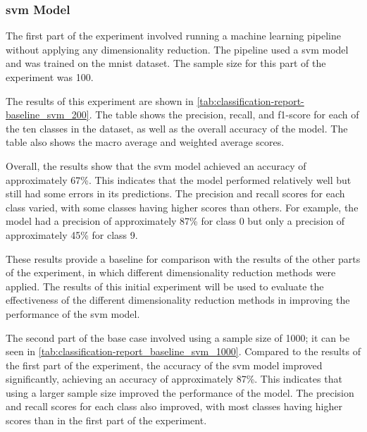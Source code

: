 \subsubsection{svm Model}\label{subsubsec:experiment_4_no_dimmensionality_reduction}





The first part of the experiment involved running a machine learning pipeline without applying any dimensionality reduction. The pipeline used a \gls{svm} model and was trained on the \gls{mnist} dataset. The sample size for this part of the experiment was 100.

The results of this experiment are shown in \ref{tab:classification-report-baseline_svm_200}. The table shows the precision, recall, and f1-score for each of the ten classes in the dataset, as well as the overall accuracy of the model. The table also shows the macro average and weighted average scores.

Overall, the results show that the \gls{svm} model achieved an accuracy of approximately 67\%. This indicates that the model performed relatively well but still had some errors in its predictions. The precision and recall scores for each class varied, with some classes having higher scores than others. For example, the model had a precision of approximately 87\% for class 0 but only a precision of approximately 45\% for class 9.

These results provide a baseline for comparison with the results of the other parts of the experiment, in which different dimensionality reduction methods were applied. The results of this initial experiment will be used to evaluate the effectiveness of the different dimensionality reduction methods in improving the performance of the \gls{svm} model.

The second part of the base case involved using a sample size of 1000; it can be seen in \ref{tab:classification-report_baseline_svm_1000}. Compared to the results of the first part of the experiment, the accuracy of the \gls{svm} model improved significantly, achieving an accuracy of approximately 87\%. This indicates that using a larger sample size improved the performance of the model. The precision and recall scores for each class also improved, with most classes having higher scores than in the first part of the experiment.

